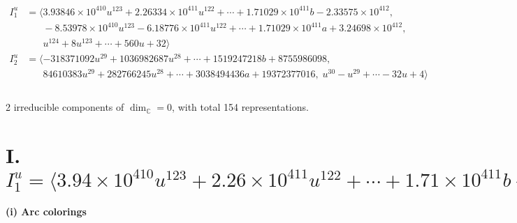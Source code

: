 \documentclass[1p]{elsarticle_modified}
\theoremstyle{definition}
\begin{document}
\begin{align*}
I^u_{1}&=\langle 
3.93846\times10^{410} u^{123}+2.26334\times10^{411} u^{122}+\cdots+1.71029\times10^{411} b-2.33575\times10^{412},\\
\phantom{I^u_{1}}&\phantom{= \langle  }-8.53978\times10^{410} u^{123}-6.18776\times10^{411} u^{122}+\cdots+1.71029\times10^{411} a+3.24698\times10^{412},\\
\phantom{I^u_{1}}&\phantom{= \langle  }u^{124}+8 u^{123}+\cdots+560 u+32\rangle \\
I^u_{2}&=\langle 
-318371092 u^{29}+1036982687 u^{28}+\cdots+1519247218 b+8755986098,\\
\phantom{I^u_{2}}&\phantom{= \langle  }84610383 u^{29}+282766245 u^{28}+\cdots+3038494436 a+19372377016,\;u^{30}- u^{29}+\cdots-32 u+4\rangle \\
\\
\end{align*}
\raggedright * 2 irreducible components of $\dim_{\mathbb{C}}=0$, with total 154 representations.\\
\newpage
\renewcommand{\arraystretch}{1}
\centering \section*{I. $I^u_{1}= \langle 3.94\times10^{410} u^{123}+2.26\times10^{411} u^{122}+\cdots+1.71\times10^{411} b-2.34\times10^{412},\;-8.54\times10^{410} u^{123}-6.19\times10^{411} u^{122}+\cdots+1.71\times10^{411} a+3.25\times10^{412},\;u^{124}+8 u^{123}+\cdots+560 u+32 \rangle$}
\flushleft \textbf{(i) Arc colorings}\\
\end{document}
